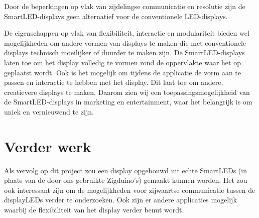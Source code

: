 \documentclass{article}
\begin{document}
Door de beperkingen op vlak van zijdelingse communicatie en resolutie zijn de SmartLED-displays geen alternatief voor de conventionele LED-displays. 

De eigenschappen op vlak van flexibiliteit, interactie en modulariteit bieden wel mogelijkheden om andere vormen van displays te maken die met conventionele displays technisch moeilijker of duurder te maken zijn. De SmartLED-displays laten toe om het display volledig te vormen rond de oppervlakte waar het op geplaatst wordt. Ook is het mogelijk om tijdens de applicatie de vorm aan te passen en interactie te hebben met het display. Dit laat toe om andere, creatievere displays te maken. Daarom zien wij een toepassingsmogelijkheid van de SmartLED-displays in marketing en entertainment, waar het belangrijk is om uniek en vernieuwend te zijn.


\section{Verder werk}
Als vervolg op dit project zou een display opgebouwd uit echte SmartLEDs (in plaats van de door ons gebruikte Zigduino's) gemaakt kunnen worden. Het zou ook interessant zijn om de mogelijkheden voor zijwaartse communicatie tussen de displayLEDs verder te onderzoeken. Ook zijn er andere applicaties mogelijk waarbij de flexibiliteit van het display verder benut wordt.



\end{document}
